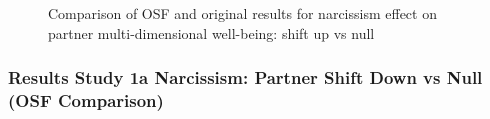 \documentclass[
  singlecolumn]{article}
\begin{document}
\begin{figure}


\caption{\label{fig-results-narcissism-partner-up-comparison}Comparison
of OSF and original results for narcissism effect on partner
multi-dimensional well-being: shift up vs null}

\end{figure}%

\newpage{}

\subsubsection{Results Study 1a Narcissism: Partner Shift Down vs Null
(OSF
Comparison)}\label{results-study-1a-narcissism-partner-shift-down-vs-null-osf-comparison}
\end{document}
